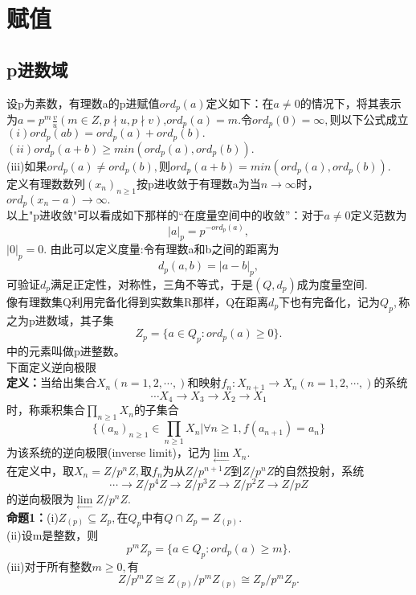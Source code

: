 \documentclass[UTF8]{article}
\begin{document}
\section{赋值}
    \subsection{p进数域}
  设p为素数，有理数a的p进赋值$ord_{p}(a)$定义如下：在$a\neq 0$的情况下，将其表示为$a=p^{m}\frac{v}{u}(m\in Z,p\nmid u,p\nmid v)$,$ord_{p}(a)=m.$令$ord_{p}(0)=\infty,$则以下公式成立\\
  $(i)ord_{p}(ab)=ord_{p}(a)+ord_{p}(b).$\\
  $(ii)ord_{p}(a+b)\geq min(ord_{p}(a),ord_{p}(b)).$\\
  (iii)如果$ord_{p}(a)\neq ord_{p}(b),$则$ord_{p}(a+b)=min(ord_{p}(a),ord_{p}(b)).$\\
  定义有理数数列$(x_{n})_{n\geq 1}$按p进收敛于有理数a为当$n\rightarrow \infty $时，$ord_{p}(x_{n}-a)\rightarrow \infty .$\\
  以上"p进收敛"可以看成如下那样的“在度量空间中的收敛”：对于$a\neq 0$定义范数为$$
 |a|_{p}=p^{-ord_{p}(a)}, 
  $$
  $|0|_{p}=0.$
  由此可以定义度量:令有理数a和b之间的距离为$$
  d_{p}(a,b)=|a-b|_{p},
  $$
  可验证$d_{p}$满足正定性，对称性，三角不等式，于是$(Q,d_{p})$成为度量空间.\\
  像有理数集Q利用完备化得到实数集R那样，Q在距离$d_{p}$下也有完备化，记为$Q_{p},$称之为p进数域，其子集$$
  Z_{p}=\{a\in Q_{p}:ord_{p}(a)\geq 0\}.
  $$
  中的元素叫做p进整数。\\
  下面定义逆向极限\\
  \textbf{定义：}当给出集合$X_{n}(n=1,2,\cdots,)$和映射$f_{n}:X_{n+1}\rightarrow X_{n}(n=1,2,\cdots,)$的系统
  $$\cdots X_{4}\rightarrow X_{3}\rightarrow X_{2}\rightarrow X_{1}$$
  时，称乘积集合$\prod_{n\geq 1}X_{n}$的子集合
  $$
  \{(a_{n})_{n\geq 1}\in \prod_{n\geq 1}X_{n}|\forall n\geq 1,f(a_{n+1})=a_{n}\}
  $$
  为该系统的逆向极限(inverse limit)，记为$\lim\limits_{\leftarrow}X_{n}.$\\
  在定义中，取$X_{n}=Z/p^{n}Z,$取$f_{n}$为从$Z/p^{n+1}Z$到$Z/p^{n}Z$的自然投射，系统$$
  \cdots\rightarrow Z/p^{4}Z\rightarrow Z/p^{3}Z\rightarrow Z/p^{2}Z\rightarrow Z/pZ
  $$
  的逆向极限为$\lim\limits_{\leftarrow}Z/p^{n}Z.$\\
  \textbf{命题1：}(i)$Z_{(p)}\subseteq Z_{p},$在$Q_{p}$中有$Q\cap Z_{p}=Z_{(p)}.$\\
  (ii)设m是整数，则$$
  p^{m}Z_{p}=\{a\in Q_{p}:ord_{p}(a)\geq m\}.
  $$
  (iii)对于所有整数$m\geq 0,$有$$
  Z/p^{m}Z\cong Z_{(p)}/p^{m}Z_{(p)}\cong Z_{p}/p^{m}Z_{p}.
  $$
\end{document}
